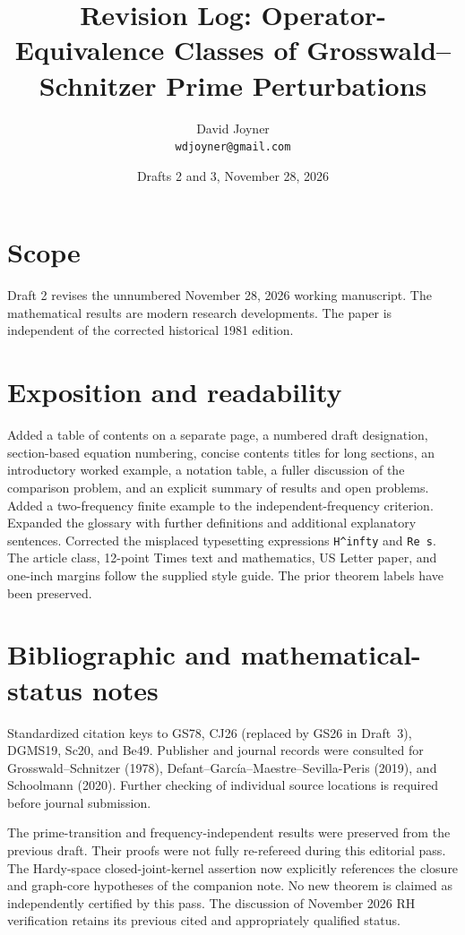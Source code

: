 \documentclass[12pt,letterpaper]{article}
\title{Revision Log: Operator-Equivalence Classes of Grosswald--Schnitzer Prime Perturbations}
\author{David Joyner\\\texttt{wdjoyner@gmail.com}}
\date{Drafts 2 and 3, November 28, 2026}
\begin{document}
\maketitle
\section{Scope}
Draft 2 revises the unnumbered November 28, 2026 working manuscript.
The mathematical results are modern research developments.
The paper is independent of the corrected historical 1981 edition.

\section{Exposition and readability}
Added a table of contents on a separate page, a numbered draft
designation, section-based equation numbering, concise contents
titles for long sections, an introductory worked example,
a notation table, a fuller discussion of the comparison problem,
and an explicit summary of results and open problems.
Added a two-frequency finite example to the independent-frequency
criterion. Expanded the glossary with further definitions
and additional explanatory sentences. Corrected the misplaced
typesetting expressions \verb|H^infty| and \verb|Re s|.
The article class, 12-point Times text and mathematics, US Letter
paper, and one-inch margins follow the supplied style guide.
The prior theorem labels have been preserved.

\section{Bibliographic and mathematical-status notes}
Standardized citation keys to GS78, CJ26 (replaced by GS26 in Draft~3), DGMS19, Sc20, and Be49.
Publisher and journal records were consulted for Grosswald--Schnitzer
(1978), Defant--Garc\'ia--Maestre--Sevilla-Peris (2019), and
Schoolmann (2020). Further checking of individual source locations
is required before journal submission.

The prime-transition and frequency-independent results were
preserved from the previous draft. Their proofs were not fully
re-refereed during this editorial pass. The Hardy-space
closed-joint-kernel assertion now explicitly references
the closure and graph-core hypotheses of the companion note.
No new theorem is claimed as independently certified by this pass.
The discussion of November 2026 RH verification retains its
previous cited and appropriately qualified status.
\end{document}
